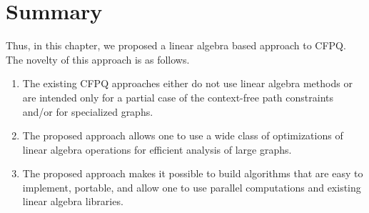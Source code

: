 \section{Summary}
Thus, in this chapter, we proposed a linear algebra based approach to CFPQ. The novelty of this approach is as follows.
\begin{enumerate}
    \item The existing CFPQ approaches either do not use linear algebra methods or are intended only for a partial case of the context-free path constraints and/or for specialized graphs.
    \item The proposed approach allows one to use a wide class of optimizations of linear algebra operations for efficient analysis of large graphs.
    \item The proposed approach makes it possible to build algorithms that are easy to implement, portable, and allow one to use parallel computations and existing linear algebra libraries.
\end{enumerate}

\FloatBarrier
